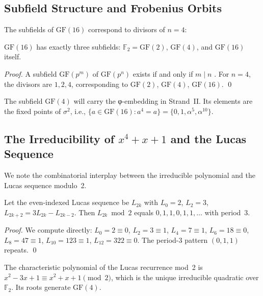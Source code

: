 \subsection{Subfield Structure and Frobenius Orbits}
\label{sec:gf16-subfields}

The subfields of \(\mathrm{GF}(16)\) correspond to divisors of \(n=4\):

\begin{proposition}
\(\mathrm{GF}(16)\) has exactly three subfields:
\(\mathbb{F}_2 = \mathrm{GF}(2)\),
\(\mathrm{GF}(4)\), and \(\mathrm{GF}(16)\) itself.
\end{proposition}

\begin{proof}
A subfield \(\mathrm{GF}(p^m)\) of \(\mathrm{GF}(p^n)\) exists if and only if
\(m \mid n\) \cite[Theorem~2.6]{lidl_finite_fields}.
For \(n=4\), the divisors are \(1, 2, 4\),
corresponding to \(\mathrm{GF}(2)\), \(\mathrm{GF}(4)\), \(\mathrm{GF}(16)\).
\qed
\end{proof}

The subfield \(\mathrm{GF}(4)\) will carry the φ-embedding in Strand~II.
Its elements are the fixed points of \(\sigma^2\), i.e.,
\(\{a\in\mathrm{GF}(16):a^4=a\} = \{0,1,\alpha^5,\alpha^{10}\}\).

\subsection{The Irreducibility of \(x^4+x+1\) and the Lucas Sequence}
\label{sec:gf16-irreducible}

We note the combinatorial interplay between the irreducible polynomial and
the Lucas sequence modulo~2.

\begin{lemma}
\label{lem:lucas-mod2}
Let the even-indexed Lucas sequence be
\(L_{2k}\) with \(L_0=2\), \(L_2=3\), \(L_{2k+2}=3L_{2k}-L_{2k-2}\).
Then \(L_{2k}\bmod 2\) equals \(0,1,1,0,1,1,\ldots\) with period~\(3\).
\end{lemma}

\begin{proof}
We compute directly:
\(L_0=2\equiv 0\), \(L_2=3\equiv 1\), \(L_4=7\equiv 1\),
\(L_6=18\equiv 0\), \(L_8=47\equiv 1\), \(L_{10}=123\equiv 1\),
\(L_{12}=322\equiv 0\).
The period-3 pattern \((0,1,1)\) repeats.
\qed
\end{proof}

\begin{corollary}
The characteristic polynomial of the Lucas recurrence mod~2 is
\(x^2 - 3x + 1 \equiv x^2 + x + 1 \pmod{2}\),
which is the unique irreducible quadratic over \(\mathbb{F}_2\).
Its roots generate \(\mathrm{GF}(4)\).
\end{corollary}

